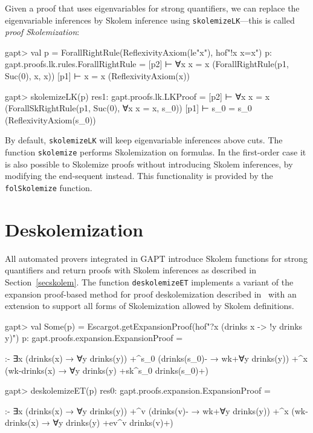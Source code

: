 \documentclass[a4paper,11pt]{book}
\begin{document}
Given a proof that uses eigenvariables for strong quantifiers, we can replace
the eigenvariable inferences by Skolem inference using
\texttt{skolemizeLK}---this is called \emph{proof Skolemization}:
\begin{clilisting}
gapt> val p = ForallRightRule(ReflexivityAxiom(le"x"), hof"!x x=x")
p: gapt.proofs.lk.rules.ForallRightRule =
[p2]  ⊢ ∀x x = x    (ForallRightRule(p1, Suc(0), x, x))
[p1]  ⊢ x = x    (ReflexivityAxiom(x))

gapt> skolemizeLK(p)
res1: gapt.proofs.lk.LKProof =
[p2]  ⊢ ∀x x = x    (ForallSkRightRule(p1, Suc(0), ∀x x = x, s_0))
[p1]  ⊢ s_0 = s_0    (ReflexivityAxiom(s_0))

\end{clilisting}

By default, \texttt{skolemizeLK} will keep eigenvariable inferences above cuts.
The function \texttt{skolemize} performs Skolemization on formulas.
In the first-order case it is also possible to Skolemize proofs without
introducing Skolem inferences, by modifying the end-sequent instead.  This
functionality is provided by the \texttt{folSkolemize} function.

\section{Deskolemization}

All automated provers integrated in GAPT introduce Skolem functions for strong
quantifiers and return proofs with Skolem inferences as described in
Section~\ref{secskolem}.  The function \texttt{deskolemizeET} implements a
variant of the expansion proof-based method for proof deskolemization
described in~\cite{Baaz2012Complexity} with an extension to support all forms
of Skolemization allowed by Skolem definitions.
\begin{clilisting}
gapt> val Some(p) = Escargot.getExpansionProof(hof"?x (drinks x -> !y drinks y)")
p: gapt.proofs.expansion.ExpansionProof =

:-
∃x (drinks(x) → ∀y drinks(y))
  +^{s_0} (drinks(s_0)- → wk+{∀y drinks(y)})
  +^{x} (wk-{drinks(x)} → ∀y drinks(y) +sk^{s_0} drinks(s_0)+)

gapt> deskolemizeET(p)
res0: gapt.proofs.expansion.ExpansionProof =

:-
∃x (drinks(x) → ∀y drinks(y))
  +^{v} (drinks(v)- → wk+{∀y drinks(y)})
  +^{x} (wk-{drinks(x)} → ∀y drinks(y) +ev^{v} drinks(v)+)

\end{clilisting}
\end{document}
